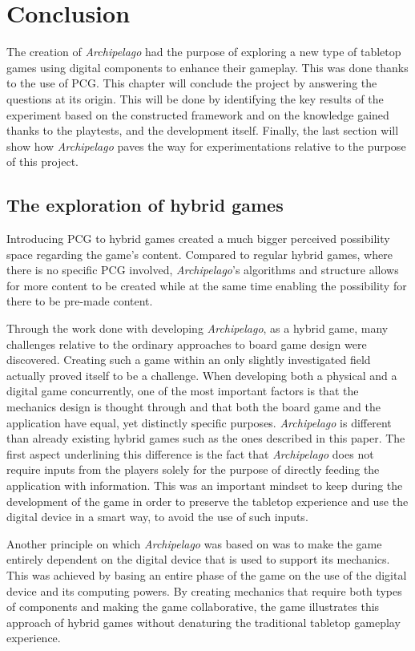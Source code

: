 \chapter{Conclusion}


The creation of \textit{Archipelago} had the purpose of exploring a new type of tabletop games using digital components to enhance their gameplay. This was done thanks to the use of PCG. This chapter will conclude the project by answering the questions at its origin. This will be done by identifying the key results of the experiment based on the constructed framework and on the knowledge gained thanks to the playtests, and the development itself. Finally, the last section will show how \textit{Archipelago} paves the way for experimentations relative to the purpose of this project.

\section{The exploration of hybrid games}
Introducing PCG to hybrid games created a much bigger perceived possibility space regarding the game's content. Compared to regular hybrid games, where there is no specific PCG involved, \textit{Archipelago}'s algorithms and structure allows for more content to be created while at the same time enabling the possibility for there to be pre-made content. 

Through the work done with developing \textit{Archipelago}, as a hybrid game, many challenges relative to the ordinary approaches to board game design were discovered. Creating such a game within an only slightly investigated field actually proved itself to be a challenge. When developing both a physical and a digital game concurrently, one of the most important factors is that the mechanics design is thought through and that both the board game and the application have equal, yet distinctly specific purposes. \textit{Archipelago} is different than already existing hybrid games such as the ones described in this paper. The first aspect underlining this difference is the fact that \textit{Archipelago} does not require inputs from the players solely for the purpose of directly feeding the application with information. This was an important mindset to keep during the development of the game in order to preserve the tabletop experience and use the digital device in a smart way, to avoid the use of such inputs.

Another principle on which \textit{Archipelago} was based on was to make the game entirely dependent on the digital device that is used to support its mechanics. This was achieved by basing an entire phase of the game on the use of the digital device and its computing powers. By creating mechanics that require both types of components and making the game collaborative, the game illustrates this approach of hybrid games without denaturing the traditional tabletop gameplay experience.

